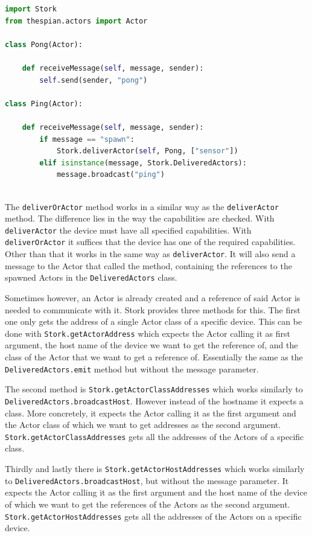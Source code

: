 \documentclass[a4paper]{article}
\begin{document}
\begin{lstlisting}[language=Python, caption=Receiving the references of the spawned Actors and broadcasting "ping", label=lst:receive]
import Stork
from thespian.actors import Actor

class Pong(Actor):

    def receiveMessage(self, message, sender):
        self.send(sender, "pong")

class Ping(Actor):

    def receiveMessage(self, message, sender):
        if message == "spawn":
            Stork.deliverActor(self, Pong, ["sensor"])
        elif isinstance(message, Stork.DeliveredActors):
            message.broadcast("ping")
        
\end{lstlisting}

The \lstinline{deliverOrActor} method works in a similar way as the \lstinline{deliverActor} method. The difference lies in the way the capabilities are checked. With \lstinline|deliverActor| the device must have all specified capabilities. With \lstinline|deliverOrActor| it suffices that the device has one of the required capabilities. Other than that it works in the same way as \lstinline|deliverActor|. It will also send a message to the Actor that called the method, containing the references to the spawned Actors in the \lstinline|DeliveredActors| class.

Sometimes however, an Actor is already created and a reference of said Actor is needed to communicate with it. Stork provides three methods for this. The first one only gets the address of a single Actor class of a specific device. This can be done with \lstinline|Stork.getActorAddress| which expects the Actor calling it as first argument, the host name of the device we want to get the reference of, and the class of the Actor that we want to get a reference of. Essentially the same as the \lstinline|DeliveredActors.emit| method but without the message parameter.

The second method is \lstinline|Stork.getActorClassAddresses| which works similarly to \lstinline|DeliveredActors.broadcastHost|. However instead of the hostname it expects a class. More concretely, it expects the Actor calling it as the first argument and the Actor class of which we want to get addresses as the second argument. \lstinline|Stork.getActorClassAddresses| gets all the addresses of the Actors of a specific class.

Thirdly and lastly there is \lstinline|Stork.getActorHostAddresses| which works similarly to \lstinline|DeliveredActors.broadcastHost|, but without the message parameter. It expects the Actor calling it as the first argument and the host name of the device of which we want to get the references of the Actors as the second argument. \lstinline|Stork.getActorHostAddresses| gets all the addresses of the Actors on a specific device.
\end{document}
